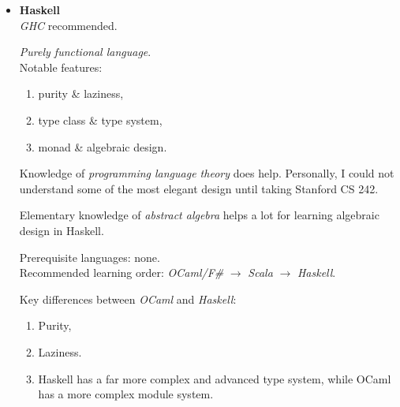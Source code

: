 \documentclass{article}
\begin{document}
\begin{itemize}
    \item \textbf{Haskell}\\
    \emph{GHC} recommended.
    
    \emph{Purely functional language}.\\

    Notable features:
    \begin{enumerate}
        \item purity \& laziness,
        \item type class \& type system,
        \item monad \& algebraic design.
    \end{enumerate}
    
    Knowledge of \emph{programming language theory} does help. Personally, I could not understand some of the most elegant design until taking Stanford CS 242.

    Elementary knowledge of \emph{abstract algebra} helps a lot for learning algebraic design in Haskell.
    
    Prerequisite languages: none.\\
    Recommended learning order:
    \emph{OCaml/F\#} $\rightarrow$ \emph{Scala} $\rightarrow$ \emph{Haskell}.
    
    Key differences between \emph{OCaml} and \emph{Haskell}:
    \begin{enumerate}
        \item Purity,
        \item Laziness.
        \item Haskell has a far more complex and advanced type system, while OCaml has a more complex module system.
    \end{enumerate}
    

\end{itemize}
\end{document}
